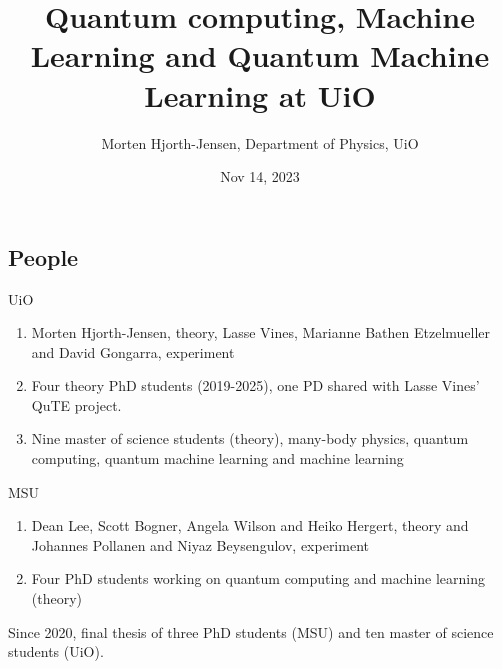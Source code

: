 \documentclass[%
oneside,                 %
final,                   %
10pt]{article}
\begin{document}

\newcommand{\exercisesection}[1]{\subsection*{#1}}






\title{Quantum computing, Machine Learning and Quantum Machine Learning at UiO}


\author{Morten Hjorth-Jensen, Department of Physics, UiO\inst{}}
\institute{}

\date{Nov 14, 2023
}

\subsection{People}

\begin{block}{UiO }
\begin{enumerate}
\item Morten Hjorth-Jensen, theory, Lasse Vines, Marianne Bathen Etzelmueller and David Gongarra, experiment

\item Four theory PhD students (2019-2025), one PD shared with Lasse Vines' QuTE project.

\item Nine  master of science students  (theory), many-body physics, quantum computing, quantum machine learning and machine learning
\end{enumerate}

\noindent
\end{block}
\begin{block}{MSU }
\begin{enumerate}
\item Dean Lee, Scott Bogner, Angela Wilson and Heiko Hergert, theory and Johannes Pollanen and Niyaz Beysengulov, experiment

\item Four PhD students working on quantum computing and machine learning (theory)
\end{enumerate}

\noindent
\end{block}
Since 2020, final thesis of three PhD students (MSU) and ten master of science students (UiO).
\end{document}
